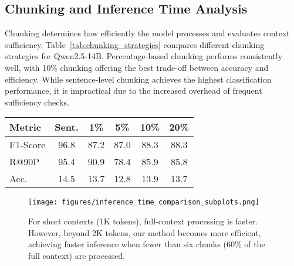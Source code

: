 \noindent\begin{minipage}[t]{0.48\textwidth}
\vspace{-3em}

\subsection{Chunking and Inference Time Analysis}
\label{sec:chunking}
Chunking determines how efficiently the model processes and evaluates context sufficiency. Table~\ref{tab:chunking_strategies} compares different chunking strategies for Qwen2.5-14B. Percentage-based chunking performs consistently well, with 10\% chunking offering the best trade-off between accuracy and efficiency. While sentence-level chunking achieves the highest classification performance, it is impractical due to the increased overhead of frequent sufficiency checks.
\end{minipage}
\hfill
\begin{minipage}[t]{0.48\textwidth}
    
    \begin{tabular}{lccccc}
        \toprule
        \textbf{Metric} & \textbf{Sent.} & \textbf{1\%} &  \textbf{5\%} & \textbf{10\%} & \textbf{20\%} \\
        \midrule
F1-Score & 96.8 & 87.2 & 87.0 & 88.3 & 88.3 \\
R@90P & 95.4 & 90.9 & 78.4 & 85.9 & 85.8 \\
Acc. & 14.5 & 13.7 & 12.8 & 13.9 & 13.7 \\
    \bottomrule
    \end{tabular}
\label{tab:chunking_strategies}

\end{minipage}


\begin{figure*}[ht!]
    \centering
    \texttt{[image: figures/inference\_time\_comparison\_subplots.png]}
    \caption{For short contexts (1K tokens), full-context processing is faster. However, beyond 2K tokens, our method becomes more efficient, achieving faster inference when fewer than six chunks (60\% of the full context) are processed.
    }
\label{fig:inference_time_comparison_subplots}
\end{figure*}

